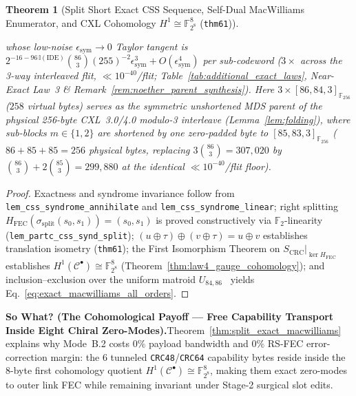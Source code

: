 \documentclass[11pt,letterpaper]{article}
\theoremstyle{spectralthm}
\newtheorem{theorem}{Theorem}[section]
\begin{document}
\begin{theorem}[Split Short Exact CSS Sequence, Self-Dual MacWilliams Enumerator, and CXL Cohomology $H^1 \cong \mathbb{F}_{2^8}^8$ (\texttt{thm61})]
\begin{enumerate}
whose low-noise $\epsilon_{\mathrm{sym}} \to 0$ Taylor tangent is $2^{-16 - 96\,\mathbb{I}(\mathrm{IDE})}\binom{86}{3}(255)^{-2}\epsilon_{\mathrm{sym}}^3 + O(\epsilon_{\mathrm{sym}}^4)$ per sub-codeword ($3\times$ across the 3-way interleaved flit, $\ll 10^{-40}$/flit; Table~\ref{tab:additional_exact_laws}, Near-Exact Law~3 \& Remark~\ref{rem:noether_parent_synthesis}). Here $3 \times [86,84,3]_{\mathbb{F}_{256}}$ ($258$ virtual bytes) serves as the symmetric unshortened MDS parent of the physical 256-byte CXL~3.0/4.0 modulo-3 interleave (Lemma~\ref{lem:folding}), where sub-blocks $m \in \{1,2\}$ are shortened by one zero-padded byte to $[85,83,3]_{\mathbb{F}_{256}}$ ($86 + 85 + 85 = 256$ physical bytes, replacing $3\binom{86}{3} = 307{,}020$ by $\binom{86}{3} + 2\binom{85}{3} = 299{,}880$ at the identical $\ll 10^{-40}$/flit floor).
\end{enumerate}
\end{theorem}
\begin{proof}
Exactness and syndrome invariance follow from \texttt{lem\_css\_syndrome\_annihilate} and \texttt{lem\_css\_syndrome\_linear}; right splitting $H_{\mathrm{FEC}}(\sigma_{\mathrm{split}}(s_0, s_1)) = (s_0, s_1)$ is proved constructively via $\mathbb{F}_2$-linearity (\texttt{lem\_partc\_css\_synd\_split}); $(u \oplus \tau) \oplus (v \oplus \tau) = u \oplus v$ establishes translation isometry (\texttt{thm61}); the First Isomorphism Theorem on $S_{\mathrm{CRC}}|_{\ker H_{\mathrm{FEC}}}$ establishes $H^1(\mathcal{C}^\bullet) \cong \mathbb{F}_{2^8}^8$ (Theorem~\ref{thm:law4_gauge_cohomology}); and inclusion--exclusion over the uniform matroid $U_{84,86}$~\cite{greene1976weight} yields Eq.~\eqref{eq:exact_macwilliams_all_orders}.
\end{proof}

\noindent\textbf{So What? (The Cohomological Payoff --- Free Capability Transport Inside Eight Chiral Zero-Modes).}\;Theorem~\ref{thm:split_exact_macwilliams} explains why Mode~B.2 costs $0\%$ payload bandwidth and $0\%$ RS-FEC error-correction margin: the 6 tunneled \texttt{CRC48}/\texttt{CRC64} capability bytes reside inside the 8-byte first cohomology quotient $H^1(\mathcal{C}^\bullet) \cong \mathbb{F}_{2^8}^8$, making them exact zero-modes to outer link FEC while remaining invariant under Stage-2 surgical slot edits.
\end{document}
